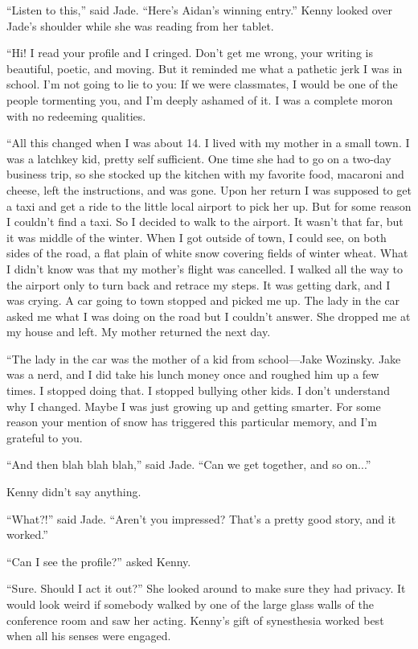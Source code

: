 \documentclass{memoir}
\begin{document}
``Listen to this,'' said Jade. ``Here's Aidan's winning entry.'' Kenny looked over Jade's shoulder while she was reading from her tablet.

``Hi! I read your profile and I cringed. Don't get me wrong, your writing is beautiful, poetic, and moving. But it reminded me what a pathetic jerk I was in school. I'm not going to lie to you: If we were classmates, I would be one of the people tormenting you, and I'm deeply ashamed of it. I was a complete moron with no redeeming qualities. 

``All this changed when I was about 14. I lived with my mother in a small town. I was a latchkey kid, pretty self sufficient. One time she had to go on a two-day business trip, so she stocked up the kitchen with my favorite food, macaroni and cheese, left the instructions, and was gone. Upon her return I was supposed to get a taxi and get a ride to the little local airport to pick her up. But for some reason I couldn't find a taxi. So I decided to walk to the airport. It wasn't that far, but it was middle of the winter. When I got outside of town, I could see, on both sides of the road, a flat plain of white snow covering fields of winter wheat. What I didn't know was that my mother's flight was cancelled. I walked all the way to the airport only to turn back and retrace my steps. It was getting dark, and I was crying. A car going to town stopped and picked me up. The lady in the car asked me what I was doing on the road but I couldn't answer. She dropped me at my house and left. My mother returned the next day. 

``The lady in the car was the mother of a kid from school---Jake Wozinsky. Jake was a nerd, and I did take his lunch money once and roughed him up a few times. I stopped doing that. I stopped bullying other kids. I don't understand why I changed. Maybe I was just growing up and getting smarter. For some reason your mention of snow has triggered this particular memory, and I'm grateful to you.

``And then blah blah blah,'' said Jade. ``Can we get together, and so on...'' 

Kenny didn't say anything. 

``What?!'' said Jade. ``Aren't you impressed? That's a pretty good story, and it worked.''

``Can I see the profile?'' asked Kenny.

``Sure. Should I act it out?'' She looked around to make sure they had privacy. It would look weird if somebody walked by one of the large glass walls of the conference room and saw her acting. Kenny's gift of synesthesia worked best when all his senses were engaged.
\end{document}
